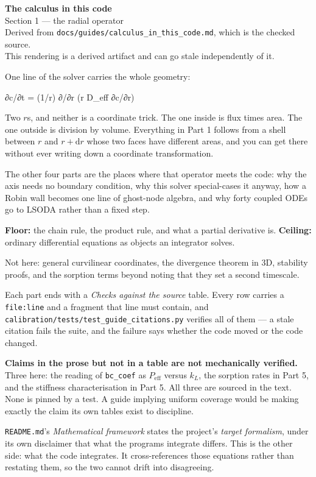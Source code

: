 \documentclass[11pt]{article}
\begin{document}
\begin{center}
{\LARGE\bfseries The calculus in this code}\\[0.45em]
{\large Section 1 — the radial operator}\\[1.1em]
{\footnotesize\color{rule}%
Derived from \texttt{docs/guides/calculus\_in\_this\_code.md}, which is the checked source.\\
This rendering is a derived artifact and can go stale independently of it.}
\end{center}

\vspace{0.6\baselineskip}

\begin{panelbox}
One line of the solver carries the whole geometry:

\begin{code}
∂c/∂t = (1/r) ∂/∂r (r D_eff ∂c/∂r)
\end{code}

Two $r$s, and neither is a coordinate trick. The one inside is flux times area. The one
outside is division by volume. Everything in Part 1 follows from a shell between $r$ and
$r + \mathrm{d}r$ whose two faces have different areas, and you can get there without ever
writing down a coordinate transformation.

The other four parts are the places where that operator meets the code: why the axis needs
no boundary condition, why this solver special-cases it anyway, how a Robin wall becomes one
line of ghost-node algebra, and why forty coupled ODEs go to LSODA rather than a fixed step.

\textbf{Floor:} the chain rule, the product rule, and what a partial derivative is.
\textbf{Ceiling:} ordinary differential equations as objects an integrator solves.

Not here: general curvilinear coordinates, the divergence theorem in 3D, stability proofs,
and the sorption terms beyond noting that they set a second timescale.

Each part ends with a \emph{Checks against the source} table. Every row carries a
\texttt{file:line} and a fragment that line must contain, and
\texttt{calibration/tests/test\_guide\_citations.py} verifies all of them — a stale citation
fails the suite, and the failure says whether the code moved or the code changed.

\textbf{Claims in the prose but not in a table are not mechanically verified.} Three here:
the reading of \texttt{bc\_coef} as $P_{\text{eff}}$ versus $k_L$, the sorption rates in
Part 5, and the stiffness characterisation in Part 5. All three are sourced in the text.
None is pinned by a test. A guide implying uniform coverage would be making exactly the
claim its own tables exist to discipline.

\texttt{README.md}'s \emph{Mathematical framework} states the project's \emph{target
formalism}, under its own disclaimer that what the programs integrate differs. This is the
other side: what the code integrates. It cross-references those equations rather than
restating them, so the two cannot drift into disagreeing.
\end{panelbox}
\end{document}
